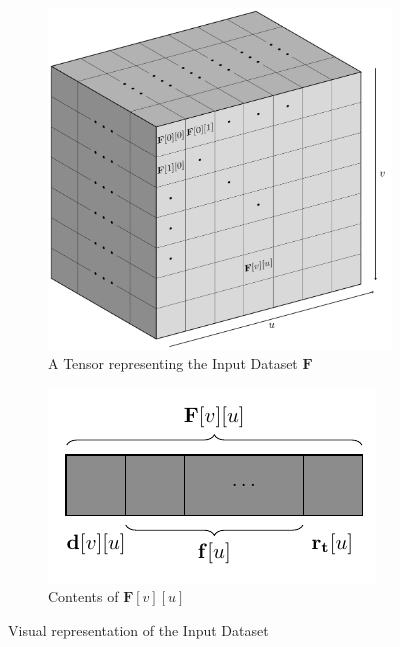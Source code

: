 \documentclass[12pt]{article}
\newcommand{\matr}[1]{\mathbf{#1}}  %
\begin{document}
    \begin{figure}[H]
        \begin{subfigure}{.64\textwidth}
            \centering
            \includegraphics[width=\linewidth]{weights_input_dataset}
            \caption{A Tensor representing the Input Dataset $\matr{F}$}
            \label{fig:A Tensor representing the complete Input Dataset}
        \end{subfigure}
        \begin{subfigure}{.35\textwidth}
            \centering
            \includegraphics[width=\linewidth]{zoomup_Fuv}
            \caption{Contents of $\matr{F}[v][u]$}
            \label{fig:Zoomed-in contents of Fvu}
        \end{subfigure}
        \caption{Visual representation of the Input Dataset}
        \label{fig:Visual representation of the Input Dataset}
    \end{figure}
\end{document}
